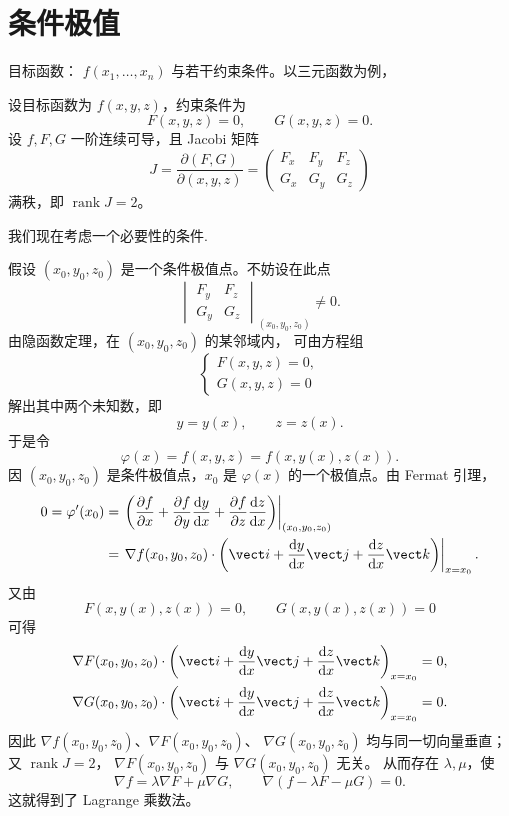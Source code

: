 \section{条件极值}

目标函数： $f(x_1,\ldots,x_n)$ 与若干约束条件。以三元函数为例，


设目标函数为 $f(x,y,z)$，约束条件为
\[
F(x,y,z)=0,\qquad G(x,y,z)=0.
\]
设 $f,F,G$ 一阶连续可导，且 Jacobi 矩阵
\[
J=\frac{\partial(F,G)}{\partial(x,y,z)}
=\begin{pmatrix}
F_x&F_y&F_z\\
G_x&G_y&G_z
\end{pmatrix}
\]
满秩，即 $\operatorname{rank}J=2$。

我们现在考虑一个必要性的条件.

假设 $(x_0,y_0,z_0)$ 是一个条件极值点。不妨设在此点
\[
\begin{vmatrix}
F_y&F_z\\
G_y&G_z
\end{vmatrix}_{(x_0,y_0,z_0)}\ne0.
\]
由隐函数定理，在 $(x_0,y_0,z_0)$ 的某邻域内，
可由方程组
\[
\begin{cases}
F(x,y,z)=0,\\
G(x,y,z)=0
\end{cases}
\]
解出其中两个未知数，即
\[
y=y(x),\qquad z=z(x).
\]
于是令
\[
\varphi(x)=f(x,y,z)=f(x,y(x),z(x)).
\]
因 $(x_0,y_0,z_0)$ 是条件极值点，$x_0$ 是
$\varphi(x)$ 的一个极值点。由 Fermat 引理，
\[
\begin{aligned}
0=\varphi'(x_0)
&=\left.
\left(
\frac{\partial f}{\partial x}
+\frac{\partial f}{\partial y}\frac{\mathrm dy}{\mathrm dx}
+\frac{\partial f}{\partial z}\frac{\mathrm dz}{\mathrm dx}
\right)\right|_{(x_0,y_0,z_0)}\\
&=\left.
\nabla f(x_0,y_0,z_0)\cdot
\left(
\vect i+\frac{\mathrm dy}{\mathrm dx}\vect j
+\frac{\mathrm dz}{\mathrm dx}\vect k
\right)\right|_{x=x_0}.
\end{aligned}
\]
又由
\[
F(x,y(x),z(x))=0,\qquad G(x,y(x),z(x))=0
\]
可得
\[
\begin{aligned}
\nabla F(x_0,y_0,z_0)\cdot
\left(
\vect i+\frac{\mathrm dy}{\mathrm dx}\vect j
+\frac{\mathrm dz}{\mathrm dx}\vect k
\right)_{x=x_0}&=0,\\
\nabla G(x_0,y_0,z_0)\cdot
\left(
\vect i+\frac{\mathrm dy}{\mathrm dx}\vect j
+\frac{\mathrm dz}{\mathrm dx}\vect k
\right)_{x=x_0}&=0.
\end{aligned}
\]
因此 $\nabla f(x_0,y_0,z_0)$、$\nabla F(x_0,y_0,z_0)$、
$\nabla G(x_0,y_0,z_0)$ 均与同一切向量垂直；
又 $\operatorname{rank}J=2$，
$\nabla F(x_0,y_0,z_0)$ 与 $\nabla G(x_0,y_0,z_0)$ 无关。
从而存在 $\lambda,\mu$，使
\[
\nabla f=\lambda\nabla F+\mu\nabla G,
\qquad
\nabla(f-\lambda F-\mu G)=0.
\]
这就得到了 Lagrange 乘数法。

